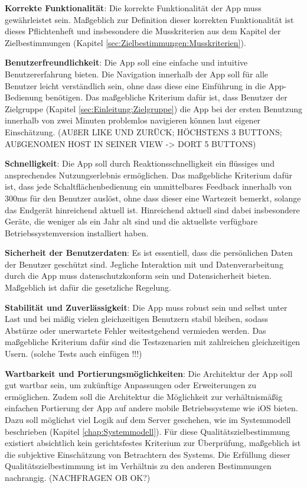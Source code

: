 \documentclass[oneside, ngerman]{sdqtechreport}
\begin{document}
\textbf{Korrekte Funktionalität}: Die korrekte Funktionalität der App muss gewährleistet sein. Maßgeblich zur Definition dieser korrekten Funktionalität ist dieses Pflichtenheft und insbesondere die Musskriterien aus dem Kapitel der Zielbestimmungen (Kapitel \ref{sec:Zielbestimmungen:Musskriterien}).

\textbf{Benutzerfreundlichkeit}: Die App soll eine einfache und intuitive Benutzererfahrung bieten. Die Navigation innerhalb der App soll für alle Benutzer leicht verständlich sein, ohne dass diese eine Einführung in die App-Bedienung benötigen. Das maßgebliche Kriterium dafür ist, dass Benutzer der Zielgruppe (Kapitel \ref{sec:Einleitung:Zielgruppe}) die App bei der ersten Benutzung innerhalb von zwei Minuten problemlos navigieren können laut eigener Einschätzung. (AUßER LIKE UND ZURÜCK; HÖCHSTENS 3 BUTTONS; AUßGENOMEN HOST IN SEINER VIEW -> DORT 5 BUTTONS)
\label{Qualitätszielbestimmungen_Benutzerfreundlichkeit}

\textbf{Schnelligkeit}: Die App soll durch Reaktionsschnelligkeit ein flüssiges und ansprechendes Nutzungserlebnis ermöglichen. Das maßgebliche Kriterium dafür ist, dass jede Schaltflächenbedienung ein unmittelbares Feedback innerhalb von 300ms für den Benutzer auslöst, ohne dass dieser eine Wartezeit bemerkt, solange das Endgerät hinreichend aktuell ist. Hinreichend aktuell sind dabei insbesondere Geräte, die weniger als ein Jahr alt sind und die aktuellste verfügbare Betriebssystemversion installiert haben.

\textbf{Sicherheit der Benutzerdaten}: Es ist essentiell, dass die persönlichen Daten der Benutzer geschützt sind. Jegliche Interaktion mit und Datenverarbeitung durch die App muss datenschutzkonform sein und Datensicherheit bieten. Maßgeblich ist dafür die gesetzliche Regelung.

\textbf{Stabilität und Zuverlässigkeit}: Die App muss robust sein und selbst unter Last und bei mäßig vielen gleichzeitigen Benutzern stabil bleiben, sodass Abstürze oder unerwartete Fehler weitestgehend vermieden werden. Das maßgebliche Kriterium dafür sind die Testszenarien mit zahlreichen gleichzeitigen Usern. (solche Tests auch einfügen !!!)

\textbf{Wartbarkeit und Portierungsmöglichkeiten}: Die Architektur der App soll gut wartbar sein, um zukünftige Anpassungen oder Erweiterungen zu ermöglichen. Zudem soll die Architektur die Möglichkeit zur verhältnismäßig einfachen Portierung der App auf andere mobile Betriebssysteme wie iOS bieten. Dazu soll möglichst viel Logik auf dem Server geschehen, wie im Systemmodell beschrieben (Kapitel \ref{chap:Systemmodell}). Für diese Qualitätszielbestimmung existiert absichtlich kein gerichtsfestes Kriterium zur Überprüfung, maßgeblich ist die subjektive Einschätzung von Betrachtern des Systems. Die Erfüllung dieser Qualitätszielbestimmung ist im Verhältnis zu den anderen Bestimmungen nachrangig. (NACHFRAGEN OB OK?)
\end{document}
